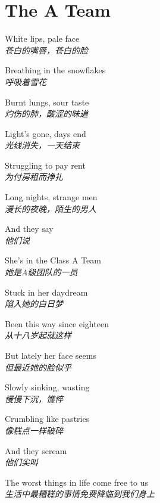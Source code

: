 \section{The A Team}

\thispagestyle{empty}


\begin{spacing}{1.5}
\begin{flushleft}
White lips, pale face\\
\textit{苍白的嘴唇，苍白的脸}\lyricspace

Breathing in the snowflakes\\
\textit{呼吸着雪花}\lyricspace

Burnt lungs, sour taste\\
\textit{灼伤的肺，酸涩的味道}\lyricspace

Light's gone, days end\\
\textit{光线消失，一天结束}\lyricspace

Struggling to pay rent\\
\textit{为付房租而挣扎}\lyricspace

Long nights, strange men\\
\textit{漫长的夜晚，陌生的男人}\lyricspace

And they say\\
\textit{他们说}\lyricspace

She's in the Class A Team\\
\textit{她是A级团队的一员}\lyricspace

Stuck in her daydream\\
\textit{陷入她的白日梦}\lyricspace

Been this way since eighteen\\
\textit{从十八岁起就这样}\lyricspace

But lately her face seems\\
\textit{但最近她的脸似乎}\lyricspace

Slowly sinking, wasting\\
\textit{慢慢下沉，憔悴}\lyricspace

Crumbling like pastries\\
\textit{像糕点一样破碎}\lyricspace

And they scream\\
\textit{他们尖叫}\lyricspace

The worst things in life come free to us\\
\textit{生活中最糟糕的事情免费降临到我们身上}\lyricspace


\end{flushleft}
\end{spacing}
